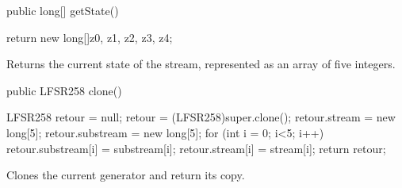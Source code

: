 \begin{htmlonly}
\end{htmlonly}
\begin{code}

    public long[] getState() \begin{hide} {
        return new long[]{z0, z1, z2, z3, z4};
    } \end{hide}
\end{code}
\begin{tabb} Returns the current state of the stream, represented as
  an array of five integers.
\end{tabb}
\begin{htmlonly}
\end{htmlonly}
\begin{code}

   public LFSR258 clone() \begin{hide} {
      LFSR258 retour = null;
      retour = (LFSR258)super.clone();
      retour.stream = new long[5];
      retour.substream = new long[5];
      for (int i = 0; i<5; i++) {
         retour.substream[i] = substream[i];
         retour.stream[i] = stream[i];
      }
      return retour;
   }\end{hide}
\end{code}
 \begin{tabb} Clones the current generator and return its copy.
 \end{tabb}
 \begin{htmlonly}
\end{htmlonly}
